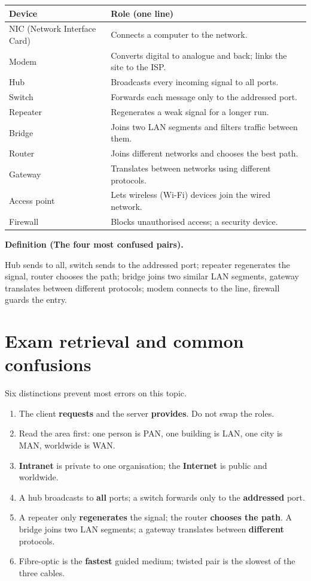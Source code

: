 \documentclass[11pt]{article}
\newenvironment{definitionbox}[1]{%
  \par\noindent\textbf{Definition (#1).}\ \itshape
}{\par\vspace{0.3em}}
\begin{document}
\begin{center}
\begin{tabular}{p{}p{}}
\toprule
\textbf{Device} & \textbf{Role (one line)} \\
\midrule
NIC (Network Interface Card) & Connects a computer to the network. \\
Modem & Converts digital to analogue and back; links the site to the ISP. \\
Hub & Broadcasts every incoming signal to all ports. \\
Switch & Forwards each message only to the addressed port. \\
Repeater & Regenerates a weak signal for a longer run. \\
Bridge & Joins two LAN segments and filters traffic between them. \\
Router & Joins different networks and chooses the best path. \\
Gateway & Translates between networks using different protocols. \\
Access point & Lets wireless (Wi-Fi) devices join the wired network. \\
Firewall & Blocks unauthorised access; a security device. \\
\bottomrule
\end{tabular}
\end{center}

\begin{definitionbox}{The four most confused pairs}
Hub sends to all, switch sends to the addressed port; repeater regenerates
the signal, router chooses the path; bridge joins two similar LAN segments,
gateway translates between different protocols; modem connects to the line,
firewall guards the entry.
\end{definitionbox}

\section{Exam retrieval and common confusions}
Six distinctions prevent most errors on this topic.
\begin{enumerate}
  \item The client \textbf{requests} and the server \textbf{provides}. Do not
    swap the roles.
  \item Read the area first: one person is PAN, one building is LAN, one
    city is MAN, worldwide is WAN.
  \item \textbf{Intranet} is private to one organisation; the
    \textbf{Internet} is public and worldwide.
  \item A hub broadcasts to \textbf{all} ports; a switch forwards only to
    the \textbf{addressed} port.
  \item A repeater only \textbf{regenerates} the signal; the router
    \textbf{chooses the path}. A bridge joins two LAN segments; a gateway
    translates between \textbf{different} protocols.
  \item Fibre-optic is the \textbf{fastest} guided medium; twisted pair is
    the slowest of the three cables.
\end{enumerate}
\end{document}
